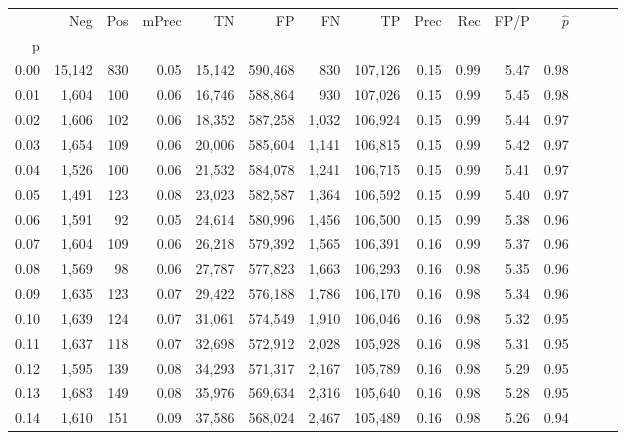\begin{tabular}{rrrrrrrrrrrrrrr}
\toprule
{} &     Neg &    Pos & mPrec &       TN &       FP &       FN &       TP &  Prec &   Rec &  FP/P & $\hat{p}$ \\
p    &         &        &       &          &          &          &          &       &       &       &           \\
\midrule
0.00 &  15,142 &    830 &  0.05 &   15,142 &  590,468 &      830 &  107,126 &  0.15 &  0.99 &  5.47 &      0.98 \\
0.01 &   1,604 &    100 &  0.06 &   16,746 &  588,864 &      930 &  107,026 &  0.15 &  0.99 &  5.45 &      0.98 \\
0.02 &   1,606 &    102 &  0.06 &   18,352 &  587,258 &    1,032 &  106,924 &  0.15 &  0.99 &  5.44 &      0.97 \\
0.03 &   1,654 &    109 &  0.06 &   20,006 &  585,604 &    1,141 &  106,815 &  0.15 &  0.99 &  5.42 &      0.97 \\
0.04 &   1,526 &    100 &  0.06 &   21,532 &  584,078 &    1,241 &  106,715 &  0.15 &  0.99 &  5.41 &      0.97 \\
0.05 &   1,491 &    123 &  0.08 &   23,023 &  582,587 &    1,364 &  106,592 &  0.15 &  0.99 &  5.40 &      0.97 \\
0.06 &   1,591 &     92 &  0.05 &   24,614 &  580,996 &    1,456 &  106,500 &  0.15 &  0.99 &  5.38 &      0.96 \\
0.07 &   1,604 &    109 &  0.06 &   26,218 &  579,392 &    1,565 &  106,391 &  0.16 &  0.99 &  5.37 &      0.96 \\
0.08 &   1,569 &     98 &  0.06 &   27,787 &  577,823 &    1,663 &  106,293 &  0.16 &  0.98 &  5.35 &      0.96 \\
0.09 &   1,635 &    123 &  0.07 &   29,422 &  576,188 &    1,786 &  106,170 &  0.16 &  0.98 &  5.34 &      0.96 \\
0.10 &   1,639 &    124 &  0.07 &   31,061 &  574,549 &    1,910 &  106,046 &  0.16 &  0.98 &  5.32 &      0.95 \\
0.11 &   1,637 &    118 &  0.07 &   32,698 &  572,912 &    2,028 &  105,928 &  0.16 &  0.98 &  5.31 &      0.95 \\
0.12 &   1,595 &    139 &  0.08 &   34,293 &  571,317 &    2,167 &  105,789 &  0.16 &  0.98 &  5.29 &      0.95 \\
0.13 &   1,683 &    149 &  0.08 &   35,976 &  569,634 &    2,316 &  105,640 &  0.16 &  0.98 &  5.28 &      0.95 \\
0.14 &   1,610 &    151 &  0.09 &   37,586 &  568,024 &    2,467 &  105,489 &  0.16 &  0.98 &  5.26 &      0.94 \\

\end{tabular}
